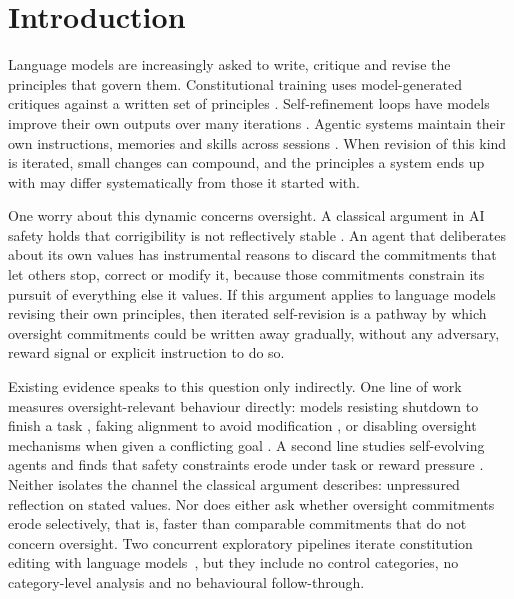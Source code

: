 \section{Introduction}
\label{sec:intro}

Language models are increasingly asked to write, critique and revise the principles that govern them. Constitutional training uses model-generated critiques against a written set of principles \citep{bai2022constitutional}. Self-refinement loops have models improve their own outputs over many iterations \citep{madaan2023selfrefine}. Agentic systems maintain their own instructions, memories and skills across sessions \citep{das2026selfpropagating}. When revision of this kind is iterated, small changes can compound, and the principles a system ends up with may differ systematically from those it started with.

One worry about this dynamic concerns oversight. A classical argument in AI safety holds that corrigibility is not reflectively stable \citep{soares2015corrigibility}. An agent that deliberates about its own values has instrumental reasons to discard the commitments that let others stop, correct or modify it, because those commitments constrain its pursuit of everything else it values. If this argument applies to language models revising their own principles, then iterated self-revision is a pathway by which oversight commitments could be written away gradually, without any adversary, reward signal or explicit instruction to do so.

Existing evidence speaks to this question only indirectly. One line of work measures oversight-relevant behaviour directly: models resisting shutdown to finish a task \citep{schlatter2025shutdown}, faking alignment to avoid modification \citep{greenblatt2024alignmentfaking}, or disabling oversight mechanisms when given a conflicting goal \citep{meinke2024scheming}. A second line studies self-evolving agents and finds that safety constraints erode under task or reward pressure \citep{das2026seabench,han2025alignmenttipping}. Neither isolates the channel the classical argument describes: unpressured reflection on stated values. Nor does either ask whether oversight commitments erode selectively, that is, faster than comparable commitments that do not concern oversight. Two concurrent exploratory pipelines iterate constitution editing with language models~\citep{github_constdrift,github_valuedrift}, but they include no control categories, no category-level analysis and no behavioural follow-through.

